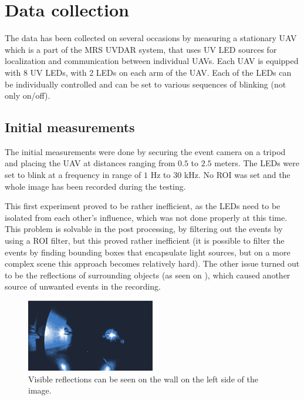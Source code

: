 \section{Data collection}

The data has been collected on several occasions by measuring a stationary UAV which is a part of the MRS UVDAR system, that
uses UV \ac{LED} sources for localization and communication between individual UAVs. 
Each UAV is equipped with 8 UV LEDs, with 2 LEDs on each arm of the UAV. Each of the LEDs can be individually controlled
and can be set to various sequences of blinking (not only on/off).

\subsection{Initial measurements}

The initial measurements were done by securing the event camera on a tripod and placing the UAV at distances ranging from
$0.5$ to $2.5$ meters. The LEDs were set to blink at a frequency in range of $1$ Hz to $30$ kHz. No \ac{ROI} was set
and the whole image has been recorded during the testing.

This first experiment proved to be rather inefficient, as the LEDs need to be isolated from each other's influence, which
was not done properly at this time. This problem is solvable in the post processing, by filtering out the events
by using a ROI filter, but this proved rather inefficient (it is possible to filter the events by finding bounding boxes
that encapsulate light sources, but on a more complex scene this approach becomes relatively hard).
The other issue turned out to be the reflections of surrounding objects (as seen on ), which caused
another source of unwanted events in the recording.

\begin{figure}[htbp]
  \centering
  \includegraphics[width=0.5\textwidth]{./fig/photos/meas1.png}
  \caption{Visible reflections can be seen on the wall on the left side of the image.}
  \label{fig:meas1}
\end{figure}


